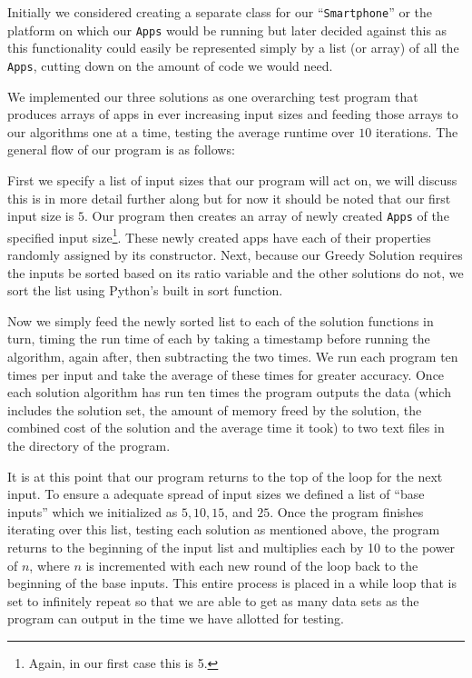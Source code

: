 \documentclass{article}
\begin{document}
Initially we considered creating a separate class for our ``\texttt{Smartphone}'' or the platform on which our \texttt{Apps} would be running but later decided against this as this functionality could easily be represented simply by a list (or array) of all the \texttt{Apps}, cutting down on the amount of code we would need.

We implemented our three solutions as one overarching test program that produces arrays of apps in ever increasing input sizes and feeding those arrays to our algorithms one at a time, testing the average runtime over $10$ iterations. The general flow of our program is as follows:

First we specify a list of input sizes that our program will act on, we will discuss this is in more detail further along but for now it should be noted that our first input size is $5$. Our program then creates an array of newly created \texttt{Apps} of the specified input size\footnote{Again, in our first case this is 5.}. These newly created apps have each of their properties randomly assigned by its constructor. Next, because our Greedy Solution requires the inputs be sorted based on its ratio variable and the other solutions do not, we sort the list using Python’s built in sort function.

Now we simply feed the newly sorted list to each of the solution functions in turn, timing the run time of each by taking a timestamp before running the algorithm, again after, then subtracting the two times. We run each program ten times per input and take the average of these times for greater accuracy. Once each solution algorithm has run ten times the program outputs the data (which includes the solution set, the amount of memory freed by the solution, the combined cost of the solution and the average time it took) to two text files in the directory of the program.

It is at this point that our program returns to the top of the loop for the next input. To ensure a adequate spread of input sizes we defined a list of “base inputs” which we initialized as $5, 10, 15$, and $25$. Once the program finishes iterating over this list, testing each solution as mentioned above, the program returns to the beginning of the input list and multiplies each by 10 to the power of $n$, where $n$ is incremented with each new round of the loop back to the beginning of the base inputs. This entire process is placed in a while loop that is set to infinitely repeat so that we are able to get as many data sets as the program can output in the time we have allotted for testing.
\end{document}
